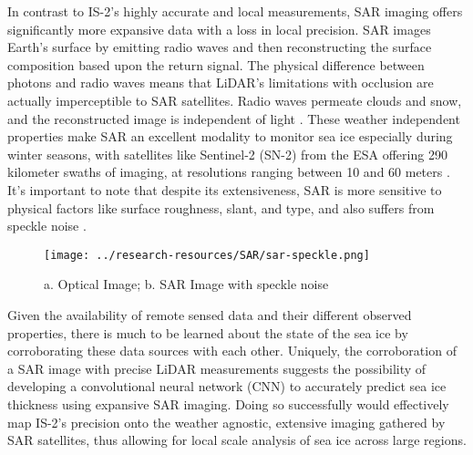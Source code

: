 In contrast to IS-2's highly accurate and local measurements, SAR imaging offers significantly more expansive data with a loss in local precision. SAR images Earth's surface by emitting radio waves and then reconstructing the surface composition based upon the return signal. The physical difference between photons and radio waves means that LiDAR's limitations with occlusion are actually imperceptible to SAR satellites. Radio waves permeate clouds and snow, and the reconstructed image is independent of light \cite{SAR-Info}. These weather independent properties make SAR an excellent modality to monitor sea ice especially during winter seasons, with satellites like Sentinel-2 (SN-2) from the ESA offering 290 kilometer swaths of imaging, at resolutions ranging between 10 and 60 meters \cite{Sentinel-2-Availability}. It's important to note that despite its extensiveness, SAR is more sensitive to physical factors like surface roughness, slant, and type, and also suffers from speckle noise \cite{SAR-Info}. 

\begin{figure}[h]
	\centering
	\texttt{[image: ../research-resources/SAR/sar-speckle.png]}
	\caption{a. Optical Image; b. SAR Image with speckle noise}
\end{figure}

\indent Given the availability of remote sensed data and their different observed properties, there is much to be learned about the state of the sea ice by corroborating these data sources with each other. Uniquely, the corroboration of a SAR image with precise LiDAR measurements suggests the possibility of developing a convolutional neural network (CNN) to accurately predict sea ice thickness using expansive SAR imaging. Doing so successfully would effectively map IS-2's precision onto the weather agnostic, extensive imaging gathered by SAR satellites, thus allowing for local scale analysis of sea ice across large regions.


